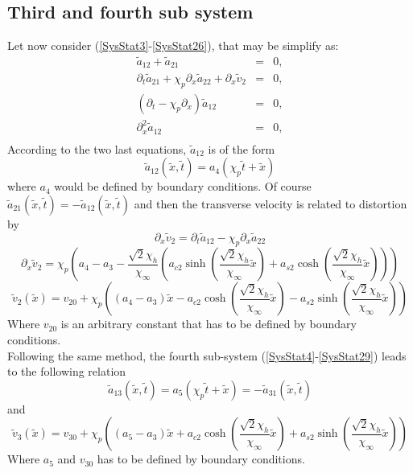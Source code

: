 \documentclass[
10pt, %
a4paper, %
oneside, %
headinclude,footinclude, %
table
]{scrartcl}
\begin{document}
\subsection{Third and fourth sub system}
Let now consider (\ref{SysStat3}-\ref{SysStat26}), that may be simplify as:
\begin{equation}
\begin{array}{rcl}
\tilde{a}_{12}+\tilde{a}_{21}&=&0,\\   
\partial_{t}{\tilde{a}_{21}}+\chi _p\partial_{x}\tilde{a}_{22} +\partial_{x}{\tilde{v}_2}&=&0,\\   
(\partial_{t}-\chi_p\partial_{x})\tilde{a}_{12} &=&0,\\   
\partial_{x}^2\tilde{a}_{12}&=&0,\\   
\end{array}
\end{equation}
According to the two last equations, $\tilde{a}_{12}$ is of the form
$$
\tilde{a}_{12}(\tilde{x},\tilde{t})=a_{4}(\chi_{p}\tilde{t}+\tilde{x})
$$
where $a_{4}$ would be defined by boundary conditions. Of course $\tilde{a}_{21}(\tilde{x},\tilde{t})=-\tilde{a}_{12}(\tilde{x},\tilde{t})$ and then the transverse velocity is related to distortion by
$$
\partial_{x}{\tilde{v}_2}=\partial_{t}{\tilde{a}_{12}}-\chi _p\partial_{x}\tilde{a}_{22}    
$$
$$
\partial_{x}{\tilde{v}_2}=\chi_{p}\left(a_{4}-a_{3}-\frac{\sqrt{2}  \chi _h}{\chi
   _{\infty }}\left(a_{c2} \sinh (\frac{\sqrt{2}  \chi _h}{\chi
   _{\infty }}\tilde{x})+ a_{s2} \cosh (\frac{\sqrt{2} \chi _h}{\chi _{\infty
   }}\tilde{x} )\right)\right)
$$
$$
\tilde{v}_{2}(\tilde{x})=v_{20}+\chi_{p}\left((a_{4}-a_{3})\tilde{x}-a_{c2} \cosh (\frac{\sqrt{2}  \chi _h}{\chi
   _{\infty }}\tilde{x})- a_{s2} \sinh (\frac{\sqrt{2} \chi _h}{\chi _{\infty
   }}\tilde{x} )\right)
$$
Where $v_{20}$ is an arbitrary constant that has to be defined by boundary conditions.\\
Following the same method, the fourth sub-system (\ref{SysStat4}-\ref{SysStat29}) leads to the following relation
$$
\tilde{a}_{13}(\tilde{x},\tilde{t})=a_{5}(\chi_{p}\tilde{t}+\tilde{x})=-\tilde{a}_{31}(\tilde{x},\tilde{t})
$$
and
$$
\tilde{v}_{3}(\tilde{x})=v_{30}+\chi_{p}\left((a_{5}-a_{3})\tilde{x}+a_{c2} \cosh (\frac{\sqrt{2}  \chi _h}{\chi
   _{\infty }}\tilde{x})+ a_{s2} \sinh (\frac{\sqrt{2} \chi _h}{\chi _{\infty
   }}\tilde{x} )\right)
$$
Where $a_{5}$ and $v_{30}$ has to be defined by boundary conditions. 
\end{document}
